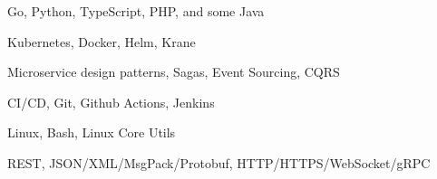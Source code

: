 \item Go, Python, TypeScript, PHP, and some Java
\item Kubernetes, Docker, Helm, Krane
\item Microservice design patterns, Sagas, Event Sourcing, CQRS
\item CI/CD, Git, Github Actions, Jenkins
\item Linux, Bash, Linux Core Utils
\item REST, JSON/XML/MsgPack/Protobuf, HTTP/HTTPS/WebSocket/gRPC
